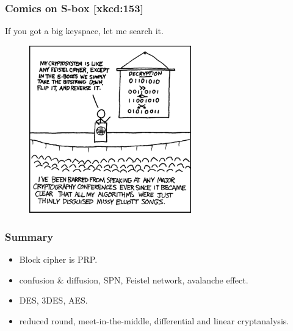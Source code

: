 \begin{frame}\frametitle{Comics on S-box [xkcd:153]}
If you got a big keyspace, let me search it.
\begin{figure}
\begin{center}
\includegraphics[width=70mm]{pic/sbox-talk} 
\end{center}
\end{figure}
\end{frame}
\begin{frame}\frametitle{Summary}
\begin{itemize}
\item Block cipher is PRP.
\item confusion \& diffusion, SPN, Feistel network, avalanche effect.
\item DES, 3DES, AES.
\item reduced round, meet-in-the-middle, differential and linear cryptanalysis. 
\end{itemize}
\end{frame}
